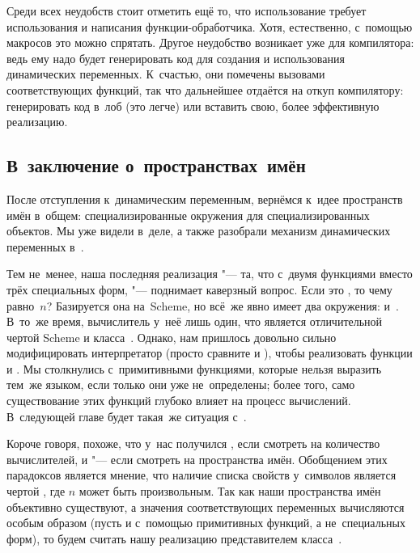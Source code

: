 Среди всех неудобств стоит отметить ещё то, что использование 
требует использования  и написания функции-обработчика. Хотя,
естественно, с~помощью макросов это можно спрятать. Другое неудобство возникает
уже для компилятора: ведь ему надо будет генерировать код для создания и
использования динамических переменных. К~счастью, они помечены вызовами
соответствующих функций, так что дальнейшее отдаётся на откуп компилятору:
генерировать код в~лоб (это легче) или вставить свою, более эффективную
реализацию.


\subsection{В~заключение о~пространствах~имён}%
\label{lisp1-2-omega/namespaces/ssect:conclusions}

После отступления к~динамическим переменным, вернёмся к~идее пространств имён
в~общем: специализированные окружения для специализированных объектов. Мы уже
видели  в~деле, а также разобрали механизм динамических переменных
в~{\CommonLisp}.

Тем не~менее, наша последняя реализация "--- та, что с~двумя функциями вместо
трёх специальных форм, "--- поднимает каверзный вопрос. Если это , то
чему равно~$n$? Базируется она на~Scheme, но всё~же явно имеет два окружения:
 и~. В~то~же время, вычислитель у~неё лишь один, что является
отличительной чертой Scheme и класса~. Однако, нам пришлось довольно
сильно модифицировать интерпретатор (просто сравните  и
), чтобы реализовать функции  и . Мы
столкнулись с~примитивными функциями, которые нельзя выразить тем~же языком,
если только они уже не~определены; более того, само существование этих функций
глубоко влияет на процесс вычислений. В~следующей главе будет такая~же ситуация
с~.

Короче говоря, похоже, что у~нас получился , если смотреть на количество
вычислителей, и  "--- если смотреть на пространства имён. Обобщением этих
парадоксов является мнение, что наличие списка свойств у~символов является
чертой , где $n$ может быть произвольным.
Так как наши пространства имён объективно существуют, а значения соответствующих
переменных вычисляются особым образом (пусть и с~помощью примитивных функций, а
не~специальных форм), то будем считать нашу реализацию представителем
класса~.


